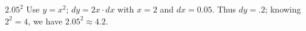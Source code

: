{$2.05^2$
}
{Use $y = x^2$; $dy = 2x\cdot dx$ with $x=2$ and $dx = 0.05$. Thus $dy = .2$; knowing $2^2=4$, we have $2.05^2 \approx 4.2$.
}

